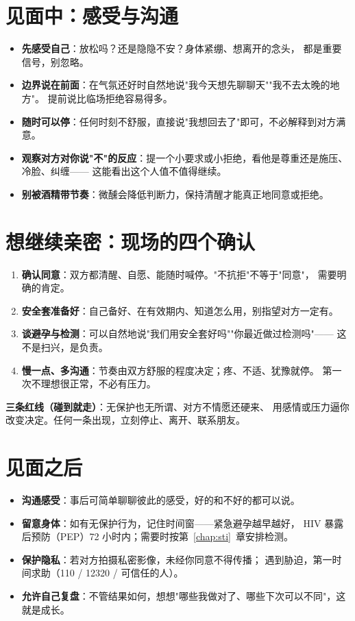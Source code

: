 \section{见面中：感受与沟通}

\begin{itemize}[leftmargin=2em]
  \item \textbf{先感受自己}：放松吗？还是隐隐不安？身体紧绷、想离开的念头，
        都是重要信号，别忽略。
  \item \textbf{边界说在前面}：在气氛还好时自然地说"我今天想先聊聊天""我不去太晚的地方"。
        提前说比临场拒绝容易得多。
  \item \textbf{随时可以停}：任何时刻不舒服，直接说"我想回去了"即可，不必解释到对方满意。
  \item \textbf{观察对方对你说"不"的反应}：提一个小要求或小拒绝，看他是尊重还是施压、冷脸、纠缠——
        这能看出这个人值不值得继续。
  \item \textbf{别被酒精带节奏}：微醺会降低判断力，保持清醒才能真正地同意或拒绝。
\end{itemize}

\section{想继续亲密：现场的四个确认}

\begin{enumerate}[leftmargin=2em,itemsep=0.3em]
  \item \textbf{确认同意}：双方都清醒、自愿、能随时喊停。"不抗拒"不等于"同意"，
        需要明确的肯定。
  \item \textbf{安全套准备好}：自己备好、在有效期内、知道怎么用，别指望对方一定有。
  \item \textbf{谈避孕与检测}：可以自然地说"我们用安全套好吗""你最近做过检测吗"——
        这不是扫兴，是负责。
  \item \textbf{慢一点、多沟通}：节奏由双方舒服的程度决定；疼、不适、犹豫就停。
        第一次不理想很正常，不必有压力。
\end{enumerate}

\noindent\textbf{三条红线（碰到就走）}：无保护也无所谓、对方不情愿还硬来、
用感情或压力逼你改变决定。任何一条出现，立刻停止、离开、联系朋友。

\section{见面之后}

\begin{itemize}[leftmargin=2em]
  \item \textbf{沟通感受}：事后可简单聊聊彼此的感受，好的和不好的都可以说。
  \item \textbf{留意身体}：如有无保护行为，记住时间窗——紧急避孕越早越好，
        HIV 暴露后预防（PEP）72 小时内；需要时按第~\ref{chap:sti}~章安排检测。
  \item \textbf{保护隐私}：若对方拍摄私密影像，未经你同意不得传播；
        遇到胁迫，第一时间求助（110 / 12320 / 可信任的人）。
  \item \textbf{允许自己复盘}：不管结果如何，想想"哪些我做对了、哪些下次可以不同"，这就是成长。
\end{itemize}


